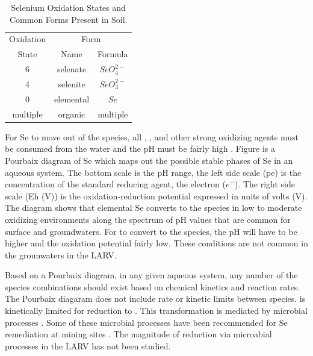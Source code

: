 \begin{linenumbers}[1]
\begin{table}[htbp]
	\centering	
	\caption[Selenium Oxidation States and Common Forms Present in Soil.]{Selenium Oxidation States and Common Forms Present in Soil.}
	\label{tab:SeOxidationStates}
	\begin{tabular}{ccc}
		\toprule
		Oxidation & \multicolumn{2}{c}{Form}\\\cmidrule{2-3}
		State & Name & Formula \\
		\midrule
		6 & selenate & $SeO_4^{2-}$\\
		4 & selenite & $SeO_3^{2-}$\\
		0 & elemental & $Se$\\
		multiple & organic & multiple\\
		\bottomrule
	\end{tabular}
\end{table}

For Se to move out of the \selenate species, all \dox, \nitrate, and other strong oxidizing agents must be consumed from the water and the pH must be fairly high .  Figure  is a Pourbaix diagram of Se which maps out the possible stable phases of Se in an aqueous system.  The bottom scale is the pH range, the left side scale (pe) is the concentration of the standard reducing agent, the electron ($e^-$).  The right side scale (Eh (V)) is the oxidation-reduction potential expressed in units of volts (V).  The diagram shows that elemental Se converts to the \selenate species in low to moderate oxidizing environments along the spectrum of pH values that are common for surface and groundwaters.  For \selenate to convert to the \selenite species, the pH will have to be higher and the oxidation potential fairly low.  These conditions are not common in the grounwaters in the LARV.

\begin{figure}
\end{figure}

Based on a Pourbaix diagram, in any given aqueous system, any number of the species combinations should exist based on chemical kinetics and reaction rates.  The Pourbaix diagaram does not include rate or kinetic limits between species.  \selenate is kinetically limited for reduction to \selenite.  This transformation is mediated by microbial processes .  Some of these microbial processes have been recommended for Se remediation at mining sites .  The magnitude of \selenate reduction via microabial processes in the LARV has not been studied.


\end{linenumbers}
